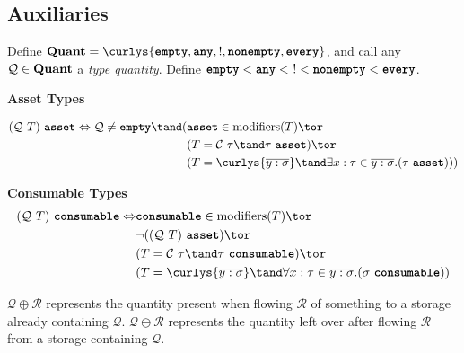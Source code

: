 \documentclass[10pt]{article}
\begin{document}

\subsection{Auxiliaries}
\begin{definition}
    Define $\Quant = \curlys{\emptyq, \any, \exactlyone, \nonempty, \every}$, and call any $\mathcal{Q} \in \textbf{Quant}$ a \emph{type quantity}.
    Define $\textbf{\texttt{empty}} < \textbf{\texttt{any}} < \,\, ! < \textbf{\texttt{nonempty}} < \textbf{\texttt{every}}$.
\end{definition}

\framebox{$\tau~\asset$} \textbf{Asset Types}

\begin{align*}
    (\mathcal{Q}~T)~\asset \iff \mathcal{Q} \neq \emptyq \tand (& \asset \in \modifiers(T) \tor \\
                                                                & (T = \mathcal{C}~\tau \tand \tau~\asset) \tor \\
                                                                & (T = \curlys{\overline{y : \sigma}} \tand \exists x : \tau \in \overline{y : \sigma}. (\tau~\asset)))
\end{align*}

\framebox{$\tau~\consumable$} \textbf{Consumable Types}
\begin{align*}
    (\mathcal{Q}~T)~\consumable \iff &\consumable \in \modifiers(T) \tor \\
                                     &\lnot((\mathcal{Q}~T)~\asset) \tor \\
                                     &(T = \mathcal{C}~\tau \tand \tau~\consumable) \tor \\
                                     &(T = \curlys{\overline{y : \sigma}} \tand \forall x : \tau \in \overline{y : \sigma}. (\sigma~\consumable))
\end{align*}

$\mathcal{Q} \oplus \mathcal{R}$ represents the quantity present when flowing $\mathcal{R}$ of something to a storage already containing $\mathcal{Q}$.
$\mathcal{Q} \ominus \mathcal{R}$ represents the quantity left over after flowing $\mathcal{R}$ from a storage containing $\mathcal{Q}$.
\end{document}
